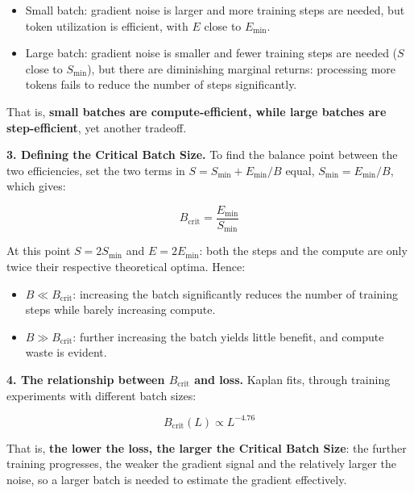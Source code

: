 \documentclass[
  english,
  11pt,
  a4paper,
]{article}
\providecommand{\tightlist}{%
  \setlength{\itemsep}{0pt}\setlength{\parskip}{0pt}}
\newenvironment{NotesFormula}{%
  \par\noindent\begin{minipage}{\linewidth}%
  \setlength{\parindent}{2em}%
  \setlength{\parskip}{0.35em}%
}{\end{minipage}\par}
\begin{document}
\begin{itemize}
\tightlist
\item
  Small batch: gradient noise is larger and more training steps are
  needed, but token utilization is efficient, with \(E\) close to
  \(E_{\min}\).
\item
  Large batch: gradient noise is smaller and fewer training steps are
  needed (\(S\) close to \(S_{\min}\)), but there are diminishing
  marginal returns: processing more tokens fails to reduce the number of
  steps significantly.
\end{itemize}

That is, \textbf{small batches are compute-efficient, while large
batches are step-efficient}, yet another tradeoff.

\begin{NotesFormula}

\textbf{3. Defining the Critical Batch Size.} To find the balance point
between the two efficiencies, set the two terms in
\(S=S_{\min}+E_{\min}/B\) equal, \(S_{\min}=E_{\min}/B\), which gives:

\[\boxed{B_{\mathrm{crit}}=\frac{E_{\min}}{S_{\min}}}\]

\end{NotesFormula}

At this point \(S=2S_{\min}\) and \(E=2E_{\min}\): both the steps and
the compute are only twice their respective theoretical optima. Hence:

\begin{itemize}
\tightlist
\item
  \(B\ll B_{\mathrm{crit}}\): increasing the batch significantly reduces
  the number of training steps while barely increasing compute.
\item
  \(B\gg B_{\mathrm{crit}}\): further increasing the batch yields little
  benefit, and compute waste is evident.
\end{itemize}

\begin{NotesFormula}

\textbf{4. The relationship between \(B_{\mathrm{crit}}\) and loss.}
Kaplan fits, through training experiments with different batch sizes:

\[\boxed{B_{\mathrm{crit}}(L)\propto L^{-4.76}}\]

\end{NotesFormula}

That is, \textbf{the lower the loss, the larger the Critical Batch
Size}: the further training progresses, the weaker the gradient signal
and the relatively larger the noise, so a larger batch is needed to
estimate the gradient effectively.
\end{document}
